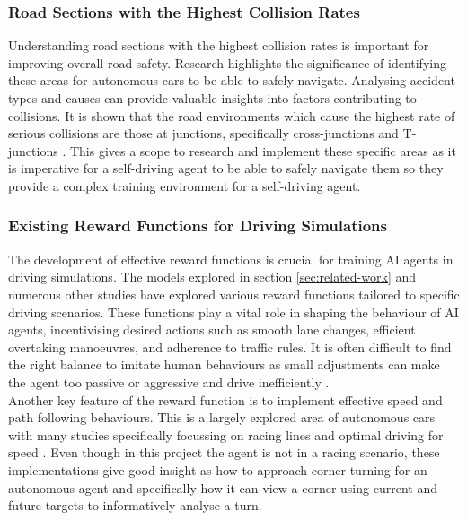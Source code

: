 \documentclass{article}
\begin{document}
\subsubsection{Road Sections with the Highest Collision Rates}
Understanding road sections with the highest collision rates is important for improving overall road safety. Research highlights the significance of identifying these areas for autonomous cars to be able to safely navigate. Analysing accident types and causes can provide valuable insights into factors contributing to collisions. It is shown that the road environments which cause the highest rate of serious collisions are those at junctions, specifically cross-junctions and T-junctions \cite{accident-types-and-causes}. This gives a scope to research and implement these specific areas as it is imperative for a self-driving agent to be able to safely navigate them so they provide a complex training environment for a self-driving agent.

\subsubsection{Existing Reward Functions for Driving Simulations}
The development of effective reward functions is crucial for training AI agents in driving simulations. The models explored in section \ref{sec:related-work} and numerous other studies have explored various reward functions tailored to specific driving scenarios. These functions play a vital role in shaping the behaviour of AI agents, incentivising desired actions such as smooth lane changes, efficient overtaking manoeuvres, and adherence to traffic rules. It is often difficult to find the right balance to imitate human behaviours as small adjustments can make the agent too passive or aggressive and drive inefficiently \cite{Predictive-reward-function-for-ai-driving}.\\ 

Another key feature of the reward function is to implement effective speed and path following behaviours. This is a largely explored area of autonomous cars with many studies specifically focussing on racing lines and optimal driving for speed \cite{Racing-reward-functions}. Even though in this project the agent is not in a racing scenario, these implementations give good insight as how to approach corner turning for an autonomous agent and specifically how it can view a corner using current and future targets to informatively analyse a turn. \cite{Deep-learning-for-AI-driving}
\end{document}
